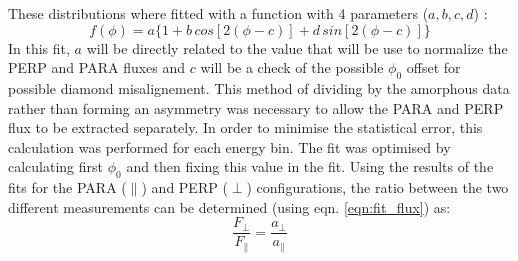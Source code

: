 These distributions where fitted with a function with 4 parameters ($ a,b,c,d $) :
\begin{equation} \label{eqn:fit_flux}
f(\phi) = a \{ 1 + b\, cos[2 (\phi - c) ]  + d\, sin[2(\phi - c)] \} 
\end{equation}
In this fit, $a$ will be directly related to the value that will be use to normalize the PERP and PARA fluxes and $c$ will be a check of the possible $\phi_0$ offset for possible diamond misalignement.
This method of dividing by the amorphous data rather than forming an asymmetry was necessary to allow the PARA and PERP flux to be extracted separately. In order to minimise the statistical error, this calculation was performed for each energy bin. The fit was optimised by calculating first $\phi_0$ and then fixing this value in the fit. 
Using the results of the fits for the PARA ($\parallel$) and PERP ($\perp$) configurations, the ratio between the two different measurements can be determined (using eqn. \ref{eqn:fit_flux}) as:
\begin{equation}
\frac{F_{\perp}}{F_{\parallel}} = \frac{a_{\perp}}{a_{\parallel}}
\end{equation}

